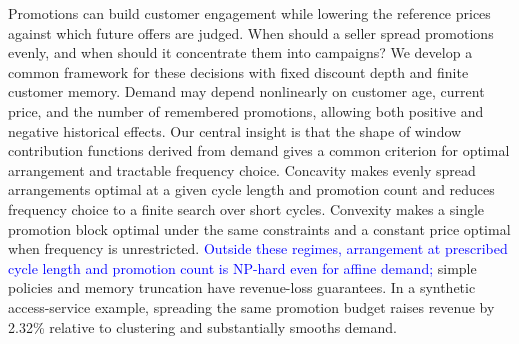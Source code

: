 Promotions can build customer engagement while lowering the reference prices against which future offers are judged. When should a seller spread promotions evenly, and when should it concentrate them into campaigns? We develop a common framework for these decisions with fixed discount depth and finite customer memory. Demand may depend nonlinearly on customer age, current price, and the number of remembered promotions, allowing both positive and negative historical effects. Our central insight is that the shape of window contribution functions derived from demand gives a common criterion for optimal arrangement and tractable frequency choice. Concavity makes evenly spread arrangements optimal at a given cycle length and promotion count and reduces frequency choice to a finite search over short cycles. Convexity makes a single promotion block optimal under the same constraints and a constant price optimal when frequency is unrestricted. \textcolor{blue}{Outside these regimes, arrangement at prescribed cycle length and promotion count is NP-hard even for affine demand;} simple policies and memory truncation have revenue-loss guarantees. In a synthetic access-service example, spreading the same promotion budget raises revenue by 2.32\% relative to clustering and substantially smooths demand.

